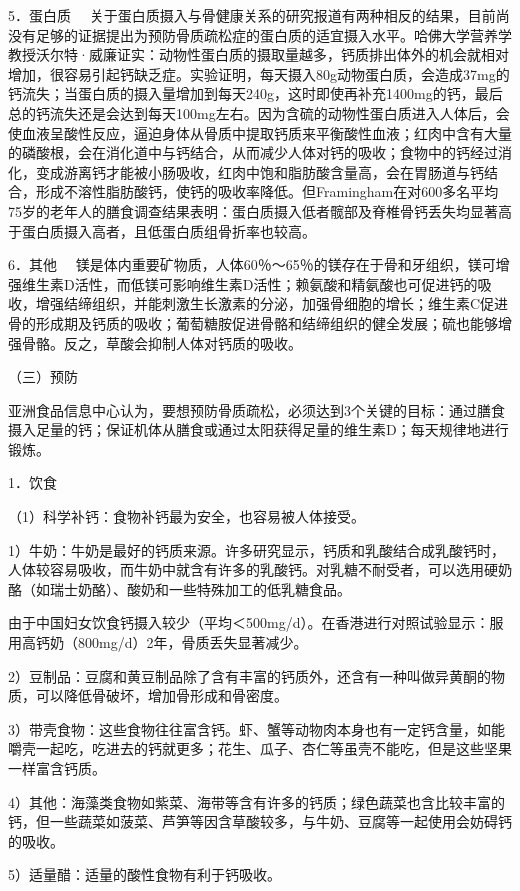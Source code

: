 {5．蛋白质}
　关于蛋白质摄入与骨健康关系的研究报道有两种相反的结果，目前尚没有足够的证据提出为预防骨质疏松症的蛋白质的适宜摄入水平。哈佛大学营养学教授沃尔特·威廉证实：动物性蛋白质的摄取量越多，钙质排出体外的机会就相对增加，很容易引起钙缺乏症。实验证明，每天摄入80g动物蛋白质，会造成37mg的钙流失；当蛋白质的摄入量增加到每天240g，这时即使再补充1400mg的钙，最后总的钙流失还是会达到每天100mg左右。因为含硫的动物性蛋白质进入人体后，会使血液呈酸性反应，逼迫身体从骨质中提取钙质来平衡酸性血液；红肉中含有大量的磷酸根，会在消化道中与钙结合，从而减少人体对钙的吸收；食物中的钙经过消化，变成游离钙才能被小肠吸收，红肉中饱和脂肪酸含量高，会在胃肠道与钙结合，形成不溶性脂肪酸钙，使钙的吸收率降低。但Framingham在对600多名平均75岁的老年人的膳食调查结果表明：蛋白质摄入低者髋部及脊椎骨钙丢失均显著高于蛋白质摄入高者，且低蛋白质组骨折率也较高。

{6．其他}
　镁是体内重要矿物质，人体60％～65％的镁存在于骨和牙组织，镁可增强维生素D活性，而低镁可影响维生素D活性；赖氨酸和精氨酸也可促进钙的吸收，增强结缔组织，并能刺激生长激素的分泌，加强骨细胞的增长；维生素C促进骨的形成期及钙质的吸收；葡萄糖胺促进骨骼和结缔组织的健全发展；硫也能够增强骨骼。反之，草酸会抑制人体对钙质的吸收。

（三）预防

亚洲食品信息中心认为，要想预防骨质疏松，必须达到3个关键的目标：通过膳食摄入足量的钙；保证机体从膳食或通过太阳获得足量的维生素D；每天规律地进行锻炼。

{1．饮食}

（1）科学补钙：食物补钙最为安全，也容易被人体接受。

1）牛奶：牛奶是最好的钙质来源。许多研究显示，钙质和乳酸结合成乳酸钙时，人体较容易吸收，而牛奶中就含有许多的乳酸钙。对乳糖不耐受者，可以选用硬奶酪（如瑞士奶酪）、酸奶和一些特殊加工的低乳糖食品。

由于中国妇女饮食钙摄入较少（平均＜500mg/d）。在香港进行对照试验显示：服用高钙奶（800mg/d）2年，骨质丢失显著减少。

2）豆制品：豆腐和黄豆制品除了含有丰富的钙质外，还含有一种叫做异黄酮的物质，可以降低骨破坏，增加骨形成和骨密度。

3）带壳食物：这些食物往往富含钙。虾、蟹等动物肉本身也有一定钙含量，如能嚼壳一起吃，吃进去的钙就更多；花生、瓜子、杏仁等虽壳不能吃，但是这些坚果一样富含钙质。

4）其他：海藻类食物如紫菜、海带等含有许多的钙质；绿色蔬菜也含比较丰富的钙，但一些蔬菜如菠菜、芦笋等因含草酸较多，与牛奶、豆腐等一起使用会妨碍钙的吸收。

5）适量醋：适量的酸性食物有利于钙吸收。

